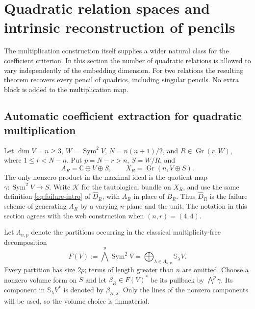 \documentclass[11pt,reqno]{amsart}
\numberwithin{equation}{section}
\theoremstyle{definition}\newtheorem{definition}[theorem]{Definition}
\theoremstyle{remark}\newtheorem{remark}[theorem]{Remark}
\newcommand{\C}{\mathbb C}\newcommand{\Q}{\mathbb Q}
\DeclareMathOperator{\Sym}{Sym}\DeclareMathOperator{\Gr}{Gr}
\begin{document}

\section{Quadratic relation spaces and intrinsic reconstruction of pencils}
\label{sec:natural-pencils}

The multiplication construction itself supplies a wider natural class
for the coefficient criterion.  In this section the number of quadratic
relations is allowed to vary independently of the embedding dimension.
For two relations the resulting theorem recovers every pencil of
quadrics, including singular pencils.  No extra block is added to the
multiplication map.

\subsection{Automatic coefficient extraction for quadratic multiplication}

Let \(\dim V=n\ge3\), \(W=\Sym^2V\), \(N=n(n+1)/2\), and
\(R\in\Gr(r,W)\), where \(1\le r<N-n\).  Put \(p=N-r>n\),
\(S=W/R\), and
\[
 A_R=\C\oplus V\oplus S,\qquad
 X_R=\Gr(n,V\oplus S).
\]
The only nonzero product in the maximal ideal is the quotient map
\(\gamma:\Sym^2V\to S\).  Write \(\mathcal K\) for the
tautological bundle on \(X_R\), and use the same definition
\eqref{eq:failure-intro} of \(\widehat D_R\), with \(A_R\) in
place of \(B_R\).  Thus \(\widehat D_R\) is the failure scheme
of generating \(A_R\) by a varying \(n\)-plane and the unit.
The notation in this section agrees with the web construction when
\((n,r)=(4,4)\).

Let \(\Lambda_{n,p}\) denote the partitions occurring in the
classical multiplicity-free decomposition
\begin{equation}\label{eq:general-exterior-decomposition}
 F(V):=\bigwedge^p\Sym^2V
       =\bigoplus_{\lambda\in\Lambda_{n,p}}\mathbb S_\lambda V.
\end{equation}
Every partition has size \(2p\); terms of length greater than \(n\)
are omitted.  Choose a nonzero volume form on \(S\) and let
\(\beta_R\in F(V)^*\) be its pullback by \(\bigwedge^p\gamma\).
Its component in \(\mathbb S_\lambda V^*\) is denoted by
\(\beta_{R,\lambda}\).  Only the lines of the nonzero components
will be used, so the volume choice is immaterial.
\end{document}
